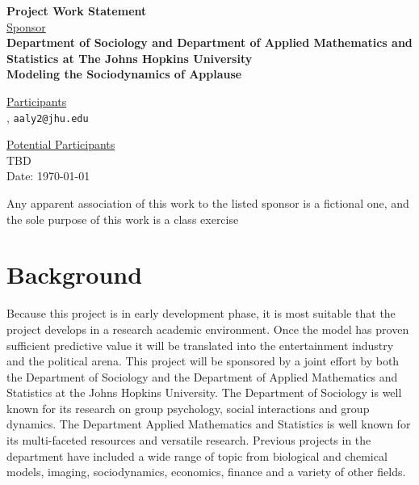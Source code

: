 \documentclass[12pt,letterpaper]{article}
\theoremstyle{definition}
\begin{document}
\def\shiftdowna{0.32in}  %
\def\shiftdownb{0.22in}  %


\begin{center}
\textbf{{\large Project Work Statement}}\\


\vspace \shiftdowna
\underline {Sponsor}\\ 
\vspace{5pt}
\textbf{{\large Department of Sociology and Department of Applied Mathematics and Statistics at The Johns Hopkins University}}\\


\vspace \shiftdowna
\textbf{{\large Modeling the Sociodynamics of Applause}}


\vspace{0.35in}
\vspace \shiftdownb
\underline {Participants} \\
\vspace{5pt}
, \texttt{aaly2@jhu.edu}

\vspace \shiftdownb
\underline {Potential Participants}\\
\vspace{5pt}
TBD \\

\vspace \shiftdowna
Date: \today

\end{center}

\vfill  
\footnoterule
\noindent \small{Any apparent association of this work to the listed sponsor is a
fictional one, and the sole purpose of this work is a class exercise}

\newpage

\section{Background} 
Because this project is in early development phase, it is most suitable that the project develops in a research academic environment. Once the model has proven sufficient predictive value it will be translated into the entertainment industry and the political arena. 
This project will be sponsored by a joint effort by both the Department of Sociology and the Department of Applied Mathematics and Statistics at the Johns Hopkins University. The Department of Sociology is well known for its research on group psychology, social interactions and group dynamics. The Department Applied Mathematics and Statistics is well known for its multi-faceted resources and versatile research. Previous projects in the department have included a wide range of topic from biological and chemical models, imaging, sociodynamics, economics, finance and a variety of other fields. 
\end{document}
